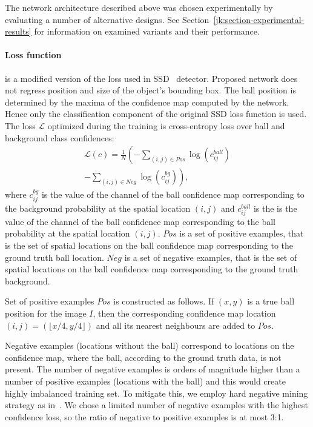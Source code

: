 \documentclass[a4paper,twoside]{article}
\begin{document}
The network architecture described above was chosen experimentally by evaluating a number of alternative designs. See Section~\ref{jk:section-experimental-results} for information on examined variants and their performance.


\paragraph{Loss function} is a modified version of the loss used in SSD~\cite{Liu16} detector. Proposed network does not regress position and size of the object's bounding box. The ball position is determined by the maxima of the confidence map computed by the network. Hence only the classification component of the original SSD loss function is used. The loss $\mathcal{L}$ optimized during the training is cross-entropy loss over ball and background class confidences:
\begin{equation}
\begin{aligned}
\mathcal{L} \left( c \right) = \frac{1}{N} 
\left(-\sum_{\left(i,j\right)\in Pos}\log\left(c_{ij}^{ball}\right) \right. \\
\left.-\sum_{\left(i,j\right)\in Neg}\log\left(c_{ij}^{bg}\right) \right),
\end{aligned}
\end{equation}
where 
$c_{ij}^{bg}$ is the value of the channel of the ball confidence map corresponding to the background probability at the spatial location $(i, j)$ and $c_{ij}^{ball}$ is the is the value of the channel of the ball confidence map corresponding to the ball probability at the spatial location $(i, j)$. $Pos$ is a set of positive examples, that is the set of spatial locations on the ball confidence map corresponding to the ground truth ball location. $Neg$ is a set of negative examples, that is the set of spatial locations on the ball confidence map corresponding to the ground truth background.

Set of positive examples $Pos$ is constructed as follows. If $(x,y)$ is a true ball position for the image $I$, then the corresponding confidence map location $(i,j) = ( \lfloor x/4, y/4 \rfloor )$ and all its nearest neighbours are added to $Pos$.

Negative examples (locations without the ball) correspond to locations on the confidence map, where the ball, according to the ground truth data, is not present.
The number of negative examples is orders of magnitude higher than a number of positive examples (locations with the ball) and this would create highly imbalanced training set.
To mitigate this, we employ hard negative mining strategy as in~\cite{Liu16}. We chose a limited number of negative examples with the highest confidence loss, so the ratio of negative to positive examples is at most 3:1.
\end{document}
